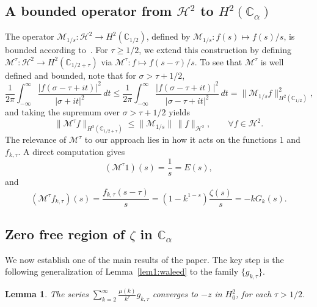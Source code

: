 \documentclass[11pt]{extarticle}
\numberwithin{equation}{section}
\theoremstyle{plain}
\newtheorem{lemma}{Lemma}[section]
\theoremstyle{definition}
\begin{document}
\subsection{A bounded operator from $\mathcal{H}^2$ to $H^2(\mathbb{C}_\alpha)$}

The operator $\mathcal{M}_{1/s} : \mathcal{H}^2 \to H^2(\mathbb{C}_{1/2})$, defined by 
$\mathcal{M}_{1/s} : f(s) \mapsto f(s)/s$, is bounded according to~\cite{6}. 
For $\tau \geq 1/2$, we extend this construction by defining 
$\mathcal{M}^\tau : \mathcal{H}^2 \to H^2(\mathbb{C}_{1/2+\tau})$ via $\mathcal{M}^\tau : f \longmapsto f(s - \tau)/s$. 
To see that $\mathcal{M}^\tau$ is well defined and bounded, note that for $\sigma > \tau + 1/2$,
\[
\frac{1}{2\pi}\int_{-\infty}^{\infty}\frac{|f(\sigma-\tau+it)|^2}{|\sigma+it|^2}\,dt
\leq \frac{1}{2\pi}\int_{-\infty}^{\infty}\frac{|f(\sigma-\tau+it)|^2}{|\sigma-\tau+it|^2}\,dt
= \|\mathcal{M}_{1/s}f\|^2_{H^2(\mathbb{C}_{1/2})},
\]
and taking the supremum over $\sigma > \tau + 1/2$ yields
\[
\|\mathcal{M}^\tau f\|_{H^2(\mathbb{C}_{1/2+\tau})} \leq \|\mathcal{M}_{1/s}\|\,\|f\|_{\mathcal{H}^2}, 
\qquad \forall f \in \mathcal{H}^2.
\]
The relevance of $\mathcal{M}^\tau$ to our approach lies in how it acts on the 
functions $1$ and $f_{k,\tau}$. A direct computation gives
\[
(\mathcal{M}^\tau 1)(s) = \frac{1}{s} = E(s),
\]
and
\[
(\mathcal{M}^\tau f_{k,\tau})(s) = \frac{f_{k,\tau}(s-\tau)}{s} 
= (1-k^{1-s})\frac{\zeta(s)}{s} = -kG_k(s).
\]

\subsection{Zero free region of $\zeta$ in $\mathbb{C}_\alpha$}

We now establish one of the main results of the paper. The key step is the following 
generalization of Lemma~\ref{lem1:waleed} to the family $\{g_{k,\tau}\}$.

\begin{lemma}\label{lem:main}
The series $\sum_{k=2}^{\infty} \frac{\mu(k)}{k^\tau} g_{k,\tau}$ converges 
to $-z$ in $H^2_0$, for each $\tau > 1/2$.
\end{lemma}
\end{document}
